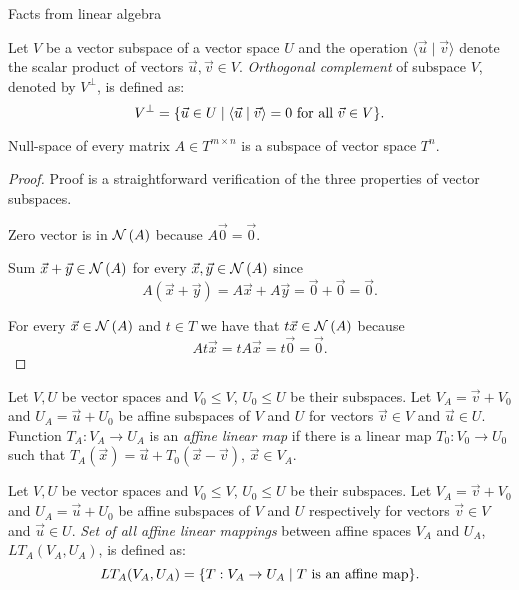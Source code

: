 \begin{chapter}{Facts from linear algebra}
\begin{definition}
Let $V$ be a vector subspace of a vector space $U$ and the operation $\langle \vec{u} \mid \vec{v} \rangle$ denote the scalar product of vectors $\vec{u}, \vec{v} \in V$. \emph{Orthogonal complement} of subspace $V$, denoted by $V ^ {\bot}$, is defined as:
\[
	V ^ {\bot} = \{ \vec{u} \in U \mid \langle \vec{u} \mid \vec{v} \rangle = 0 \text{ for all } \vec{v} \in V \} \text{.}
\]
\end{definition}

\begin{remark}
Null-space of every matrix $A \in T ^ {m \times n}$ is a subspace of vector space $T^{n}$.
\end{remark}
\begin{proof}
Proof is a straightforward verification of the three properties of vector subspaces.

Zero vector is in $\mathcal{N}\left({A}\right)$ because $A\vec{0} = \vec{0}$.

Sum $\vec{x} + \vec{y} \in \mathcal{N}\left({A}\right)$ for every $\vec{x}, \vec{y} \in \mathcal{N}\left({A}\right)$ since
\[
	A(\vec{x} + \vec{y}) = A\vec{x} + A\vec{y} = \vec{0} + \vec{0} = \vec{0} \text{.}
\]

For every $\vec{x} \in \mathcal{N}\left({A}\right)$ and $t \in T$ we have that $t \vec{x} \in \mathcal{N}\left({A}\right)$ because
\[
	At\vec{x} = tA\vec{x} = t\vec{0} = \vec{0} \text{.}
\]
\end{proof}

\begin{definition}
\label{definition-affine-linear-map}
Let $V, U$ be vector spaces and $V_0 \leq V$, $U_0 \leq U$ be their subspaces. Let $V_A = \vec{v} + V_0$ and $U_A = \vec{u} + U_0$ be affine subspaces of $V$ and $U$ for vectors $\vec{v} \in V$ and $\vec{u} \in U$. Function $T_A: V_A \rightarrow U_A$ is an \emph{affine linear map} if there is a linear map $T_0: V_0 \rightarrow U_0$ such that $T_A(\vec{x}) = \vec{u} + T_0(\vec{x} - \vec{v})$, $\vec{x} \in V_A$.
\end{definition}

\begin{definition}
Let $V, U$ be vector spaces and $V_0 \leq V$, $U_0 \leq U$ be their subspaces. Let $V_A = \vec{v} + V_0$ and $U_A = \vec{u} + U_0$ be affine subspaces of $V$ and $U$ respectively for vectors $\vec{v} \in V$ and $\vec{u} \in U$. \emph{Set of all affine linear mappings} between affine spaces $V_A$ and $U_A$, $LT_A(V_A, U_A)$, is defined as:
\[
	LT_A(V_A, U_A) = \{ T: V_A \rightarrow U_A \mid T \text{ is an affine map} \} \text{.}
\]
\end{definition}


\end{chapter}
